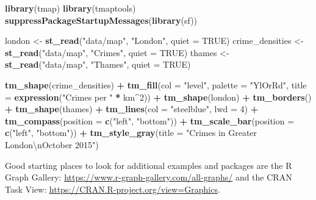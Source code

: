 \documentclass[]{book}
\newenvironment{Shaded}{\begin{snugshade}}{\end{snugshade}}
\newcommand{\KeywordTok}[1]{\textcolor[rgb]{0.13,0.29,0.53}{\textbf{#1}}}
\newcommand{\DataTypeTok}[1]{\textcolor[rgb]{0.13,0.29,0.53}{#1}}
\newcommand{\DecValTok}[1]{\textcolor[rgb]{0.00,0.00,0.81}{#1}}
\newcommand{\CharTok}[1]{\textcolor[rgb]{0.31,0.60,0.02}{#1}}
\newcommand{\StringTok}[1]{\textcolor[rgb]{0.31,0.60,0.02}{#1}}
\newcommand{\OtherTok}[1]{\textcolor[rgb]{0.56,0.35,0.01}{#1}}
\newcommand{\OperatorTok}[1]{\textcolor[rgb]{0.81,0.36,0.00}{\textbf{#1}}}
\newcommand{\NormalTok}[1]{#1}
\theoremstyle{definition}
\theoremstyle{definition}
\theoremstyle{definition}
\theoremstyle{remark}
\begin{document}
\begin{Shaded}
\begin{Highlighting}[]
\KeywordTok{library}\NormalTok{(tmap)}
\KeywordTok{library}\NormalTok{(tmaptools)}
\KeywordTok{suppressPackageStartupMessages}\NormalTok{(}\KeywordTok{library}\NormalTok{(sf))}
              
\NormalTok{london <-}\StringTok{ }\KeywordTok{st_read}\NormalTok{(}\StringTok{"data/map"}\NormalTok{, }\StringTok{"London"}\NormalTok{, }\DataTypeTok{quiet =} \OtherTok{TRUE}\NormalTok{)}
\NormalTok{crime_densities <-}\StringTok{ }\KeywordTok{st_read}\NormalTok{(}\StringTok{"data/map"}\NormalTok{, }\StringTok{"Crimes"}\NormalTok{, }\DataTypeTok{quiet =} \OtherTok{TRUE}\NormalTok{)}
\NormalTok{thames <-}\StringTok{ }\KeywordTok{st_read}\NormalTok{(}\StringTok{"data/map"}\NormalTok{, }\StringTok{"Thames"}\NormalTok{, }\DataTypeTok{quiet =} \OtherTok{TRUE}\NormalTok{)}

\KeywordTok{tm_shape}\NormalTok{(crime_densities) }\OperatorTok{+}
\StringTok{  }\KeywordTok{tm_fill}\NormalTok{(}\DataTypeTok{col =} \StringTok{"level"}\NormalTok{, }\DataTypeTok{palette =} \StringTok{"YlOrRd"}\NormalTok{, }
    \DataTypeTok{title =} \KeywordTok{expression}\NormalTok{(}\StringTok{"Crimes per "} \OperatorTok{*}\StringTok{ }\NormalTok{km}\OperatorTok{^}\DecValTok{2}\NormalTok{)) }\OperatorTok{+}\StringTok{ }
\KeywordTok{tm_shape}\NormalTok{(london) }\OperatorTok{+}\StringTok{ }\KeywordTok{tm_borders}\NormalTok{() }\OperatorTok{+}
\KeywordTok{tm_shape}\NormalTok{(thames) }\OperatorTok{+}\StringTok{ }\KeywordTok{tm_lines}\NormalTok{(}\DataTypeTok{col =} \StringTok{"steelblue"}\NormalTok{, }\DataTypeTok{lwd =} \DecValTok{4}\NormalTok{) }\OperatorTok{+}
\KeywordTok{tm_compass}\NormalTok{(}\DataTypeTok{position =} \KeywordTok{c}\NormalTok{(}\StringTok{"left"}\NormalTok{, }\StringTok{"bottom"}\NormalTok{)) }\OperatorTok{+}
\KeywordTok{tm_scale_bar}\NormalTok{(}\DataTypeTok{position =} \KeywordTok{c}\NormalTok{(}\StringTok{"left"}\NormalTok{, }\StringTok{"bottom"}\NormalTok{)) }\OperatorTok{+}\StringTok{ }
\KeywordTok{tm_style_gray}\NormalTok{(}\DataTypeTok{title =} \StringTok{"Crimes in Greater London}\CharTok{\textbackslash{}n}\StringTok{October 2015"}\NormalTok{)}
\end{Highlighting}
\end{Shaded}

Good starting places to look for additional examples and packages are
the R Graph Gallery: \url{https://www.r-graph-gallery.com/all-graphs/}
and the CRAN Task View: \url{https://CRAN.R-project.org/view=Graphics}.


\end{document}
